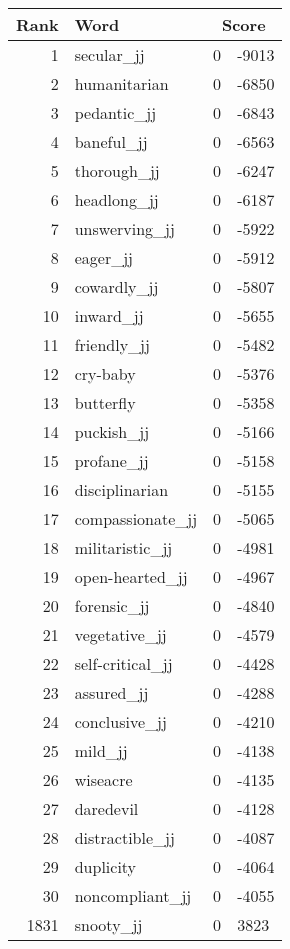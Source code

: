 \begin{longtable}[!htbp]{| rlr@{.}l |}
    \hline
    \textbf{Rank} & \textbf{Word} & \multicolumn{2}{c|}{\textbf{Score}} \\
    \hline
    \endhead
    1 & secular\_jj & 0 & -9013 \\
    2 & humanitarian & 0 & -6850 \\
    3 & pedantic\_jj & 0 & -6843 \\
    4 & baneful\_jj & 0 & -6563 \\
    5 & thorough\_jj & 0 & -6247 \\
    6 & headlong\_jj & 0 & -6187 \\
    7 & unswerving\_jj & 0 & -5922 \\
    8 & eager\_jj & 0 & -5912 \\
    9 & cowardly\_jj & 0 & -5807 \\
    10 & inward\_jj & 0 & -5655 \\
    11 & friendly\_jj & 0 & -5482 \\
    12 & cry-baby & 0 & -5376 \\
    13 & butterfly & 0 & -5358 \\
    14 & puckish\_jj & 0 & -5166 \\
    15 & profane\_jj & 0 & -5158 \\
    16 & disciplinarian & 0 & -5155 \\
    17 & compassionate\_jj & 0 & -5065 \\
    18 & militaristic\_jj & 0 & -4981 \\
    19 & open-hearted\_jj & 0 & -4967 \\
    20 & forensic\_jj & 0 & -4840 \\
    21 & vegetative\_jj & 0 & -4579 \\
    22 & self-critical\_jj & 0 & -4428 \\
    23 & assured\_jj & 0 & -4288 \\
    24 & conclusive\_jj & 0 & -4210 \\
    25 & mild\_jj & 0 & -4138 \\
    26 & wiseacre & 0 & -4135 \\
    27 & daredevil & 0 & -4128 \\
    28 & distractible\_jj & 0 & -4087 \\
    29 & duplicity & 0 & -4064 \\
    30 & noncompliant\_jj & 0 & -4055 \\
    1831 & snooty\_jj & 0 & 3823 \\

\end{longtable}
